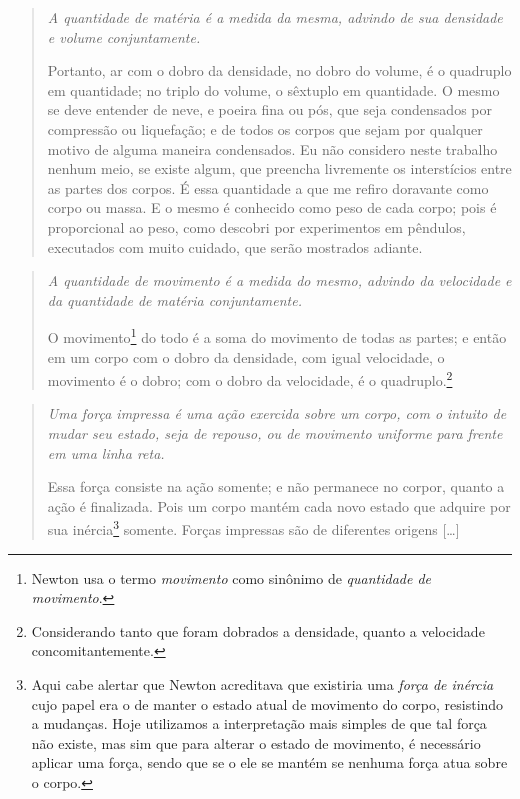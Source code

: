 \begin{quote}
\emph{A quantidade de matéria é a medida da mesma, advindo de sua densidade e volume conjuntamente.}
  
Portanto, ar com o dobro da densidade, no dobro do volume, é o quadruplo em quantidade; no triplo do volume, o sêxtuplo em quantidade. O mesmo se deve entender de neve, e poeira fina ou pós, que seja condensados por compressão ou liquefação; e de todos os corpos que sejam por qualquer motivo de alguma maneira condensados. Eu não considero neste trabalho nenhum meio, se existe algum, que preencha livremente os interstícios entre as partes dos corpos. É essa quantidade a que me refiro doravante como corpo ou massa. E o mesmo é conhecido como peso de cada corpo; pois é proporcional ao peso, como descobri por experimentos em pêndulos, executados com muito cuidado, que serão mostrados adiante.
\end{quote}

\begin{quote}
\emph{A quantidade de movimento é a medida do mesmo, advindo da velocidade e da quantidade de matéria conjuntamente.}

O movimento\footnote{Newton usa o termo \emph{movimento} como sinônimo de \emph{quantidade de movimento}.} do todo é a soma do movimento de todas as partes; e então em um corpo com o dobro da densidade, com igual velocidade, o movimento é o dobro; com o dobro da velocidade, é o quadruplo.\footnote{Considerando tanto que foram dobrados a densidade, quanto a velocidade concomitantemente.}
\end{quote}

\begin{quote}
\emph{Uma força impressa é uma ação exercida sobre um corpo, com o intuito de mudar seu estado, seja de repouso, ou de movimento uniforme para frente em uma linha reta.}

Essa força consiste na ação somente; e não permanece no corpor, quanto a ação é finalizada. Pois um corpo mantém cada novo estado que adquire por sua inércia\footnote[][-2cm]{Aqui cabe alertar que Newton acreditava que existiria uma \emph{força de inércia} cujo papel era o de manter o estado atual de movimento do corpo, resistindo a mudanças. Hoje utilizamos a interpretação mais simples de que tal força não existe, mas sim que para alterar o estado de movimento, é necessário aplicar uma força, sendo que se o ele se mantém se nenhuma força atua sobre o corpo.} somente. Forças impressas são de diferentes origens [\dots]
\end{quote}

